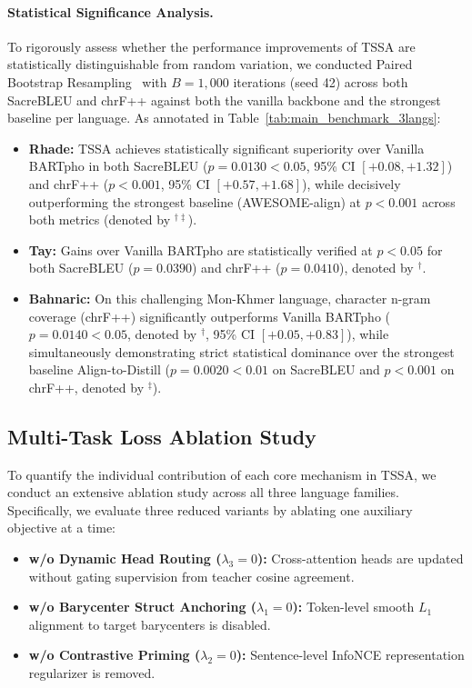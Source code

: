 \documentclass[11pt,a4paper]{article}
\begin{document}
\paragraph{Statistical Significance Analysis.}
To rigorously assess whether the performance improvements of TSSA are statistically distinguishable from random variation, we conducted Paired Bootstrap Resampling~\cite{koehn2004statistical} with $B=1,000$ iterations (seed 42) across both SacreBLEU and chrF++ against both the vanilla backbone and the strongest baseline per language.
As annotated in Table~\ref{tab:main_benchmark_3langs}:
\begin{itemize}[leftmargin=*]
    \item \textbf{Rhade:} TSSA achieves statistically significant superiority over Vanilla BARTpho in both SacreBLEU ($p = 0.0130 < 0.05$, 95\% CI $[+0.08, +1.32]$) and chrF++ ($p < 0.001$, 95\% CI $[+0.57, +1.68]$), while decisively outperforming the strongest baseline (AWESOME-align) at $p < 0.001$ across both metrics (denoted by $^{\dagger\ddagger}$).
    \item \textbf{Tay:} Gains over Vanilla BARTpho are statistically verified at $p < 0.05$ for both SacreBLEU ($p = 0.0390$) and chrF++ ($p = 0.0410$), denoted by $^\dagger$.
    \item \textbf{Bahnaric:} On this challenging Mon-Khmer language, character n-gram coverage (chrF++) significantly outperforms Vanilla BARTpho ($p = 0.0140 < 0.05$, denoted by $^\dagger$, 95\% CI $[+0.05, +0.83]$), while simultaneously demonstrating strict statistical dominance over the strongest baseline Align-to-Distill ($p = 0.0020 < 0.01$ on SacreBLEU and $p < 0.001$ on chrF++, denoted by $^\ddagger$).
\end{itemize}

\subsection{Multi-Task Loss Ablation Study}
\label{sec:ablation_study}

To quantify the individual contribution of each core mechanism in TSSA, we conduct an extensive ablation study across all three language families. Specifically, we evaluate three reduced variants by ablating one auxiliary objective at a time:
\begin{itemize}[leftmargin=*]
    \item \textbf{w/o Dynamic Head Routing ($\lambda_3 = 0$):} Cross-attention heads are updated without gating supervision from teacher cosine agreement.
    \item \textbf{w/o Barycenter Struct Anchoring ($\lambda_1 = 0$):} Token-level smooth $L_1$ alignment to target barycenters is disabled.
    \item \textbf{w/o Contrastive Priming ($\lambda_2 = 0$):} Sentence-level InfoNCE representation regularizer is removed.
\end{itemize}
\end{document}
